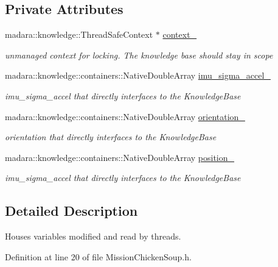 \subsection*{Private Attributes}
\begin{DoxyCompactItemize}
\item 
madara\+::knowledge\+::\+Thread\+Safe\+Context $\ast$ \hyperlink{classcontainers_1_1MissionChickenSoup_a645607952609f9c2faa48f89809782f1}{context\+\_\+}
\begin{DoxyCompactList}\small\item\em unmanaged context for locking. The knowledge base should stay in scope \end{DoxyCompactList}\item 
madara\+::knowledge\+::containers\+::\+Native\+Double\+Array \hyperlink{classcontainers_1_1MissionChickenSoup_a2b9f1fc60c385728175ffb9c7bff5eab}{imu\+\_\+sigma\+\_\+accel\+\_\+}
\begin{DoxyCompactList}\small\item\em imu\+\_\+sigma\+\_\+accel that directly interfaces to the Knowledge\+Base \end{DoxyCompactList}\item 
madara\+::knowledge\+::containers\+::\+Native\+Double\+Array \hyperlink{classcontainers_1_1MissionChickenSoup_a6ea3226a3a25d33dd84c1af6a6b5858c}{orientation\+\_\+}
\begin{DoxyCompactList}\small\item\em orientation that directly interfaces to the Knowledge\+Base \end{DoxyCompactList}\item 
madara\+::knowledge\+::containers\+::\+Native\+Double\+Array \hyperlink{classcontainers_1_1MissionChickenSoup_afa8ca26939245451a0b5e5c42b05c219}{position\+\_\+}
\begin{DoxyCompactList}\small\item\em imu\+\_\+sigma\+\_\+accel that directly interfaces to the Knowledge\+Base \end{DoxyCompactList}\end{DoxyCompactItemize}


\subsection{Detailed Description}
Houses variables modified and read by threads. 

Definition at line 20 of file Mission\+Chicken\+Soup.\+h.



